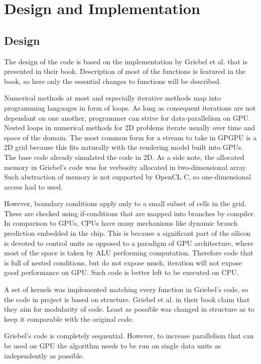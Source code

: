 \chapter{Design and Implementation}

\section{Design}
The design of the code is based on the implementation by Griebel et al. that is presented in their book\cite{griebel1998numerical}. Description of most of the functions is featured in the book, so here only the essential changes to functions will be described.

Numerical methods at most and especially iterative methods map into programming languages in form of loops. As long as consequent iterations are not dependant on one another, programmer can strive for data-parallelism on GPU. Nested loops in numerical methods for 2D problems iterate usually over time and space of the domain. The most common form for a stream to take in GPGPU is a 2D grid because this fits naturally with the rendering model built into GPUs. The base code already simulated the code in 2D. As a side note, the allocated memory in Griebel's code was for verbosity allocated in two-dimensional array. Such abstraction of memory is not supported by OpenCL C, so one-dimensional access had to used.

However, boundary conditions apply only to a small subset of cells in the grid. These are checked using if-conditions that are mapped into branches by compiler. In comparison to GPUs, CPUs have many mechanisms like dynamic branch prediction embedded in the chip. This is because a significant part of the silicon is devoted to control units as opposed to a paradigm of GPU architecture, where most of the space is taken by ALU performing computation. Therefore code that is full of nested conditions, but do not expose much, iteration will not expose good performance on GPU. Such code is better left to be executed on CPU.

A set of kernels was implemented matching every function in Griebel's code, so the code in project is based on structure. Griebel et al. in their book claim that they aim for modularity of code. Least as possible was changed in structure as to keep it comparable with the original code.

Griebel's code is completely sequential. However, to increase parallelism that can be used on GPU the algorithm needs to be run on single data units as independently as possible.

